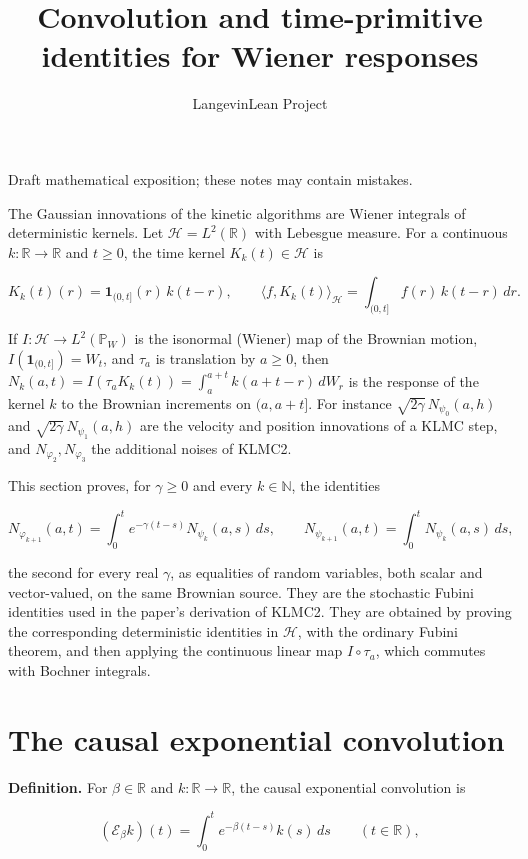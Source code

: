 \documentclass[11pt,a4paper]{article}
\title{\texorpdfstring{Convolution and time-primitive identities for Wiener responses}{Convolution and time-primitive identities for Wiener responses}}
\author{LangevinLean Project}
\date{}
\begin{document}
\maketitle
Draft mathematical exposition; these notes may contain mistakes.


The Gaussian innovations of the kinetic algorithms are Wiener integrals of deterministic kernels. Let \(\mathcal H=L^2(\mathbb R)\) with Lebesgue measure. For a continuous \(k:\mathbb R\to\mathbb R\) and \(t\ge0\), the time kernel \(K_k(t)\in\mathcal H\) is


\[K_k(t)(r)=\mathbf 1_{(0,t]}(r)\,k(t-r),\qquad\langle f,K_k(t)\rangle_{\mathcal H}=\int_{(0,t]}f(r)\,k(t-r)\,dr.\]


If \(I:\mathcal H\to L^2(\mathbb P_W)\) is the isonormal (Wiener) map of the Brownian motion, \(I(\mathbf 1_{(0,t]})=W_t\), and \(\tau_a\) is translation by \(a\ge0\), then \(N_k(a,t)=I(\tau_aK_k(t))=\int_a^{a+t}k(a+t-r)\,dW_r\) is the response of the kernel \(k\) to the Brownian increments on \((a,a+t]\). For instance \(\sqrt{2\gamma}\,N_{\psi_0}(a,h)\) and \(\sqrt{2\gamma}\,N_{\psi_1}(a,h)\) are the velocity and position innovations of a KLMC step, and \(N_{\varphi_2},N_{\varphi_3}\) the additional noises of KLMC2.




This section proves, for \(\gamma\ge0\) and every \(k\in\mathbb N\), the identities


\[N_{\varphi_{k+1}}(a,t)=\int_0^te^{-\gamma(t-s)}N_{\psi_k}(a,s)\,ds,\qquad N_{\psi_{k+1}}(a,t)=\int_0^tN_{\psi_k}(a,s)\,ds,\]


the second for every real \(\gamma\), as equalities of random variables, both scalar and vector-valued, on the same Brownian source. They are the stochastic Fubini identities used in the paper's derivation of KLMC2. They are obtained by proving the corresponding deterministic identities in \(\mathcal H\), with the ordinary Fubini theorem, and then applying the continuous linear map \(I\circ\tau_a\), which commutes with Bochner integrals.


\section{\texorpdfstring{The causal exponential convolution}{The causal exponential convolution}}


\textbf{Definition.} For \(\beta\in\mathbb R\) and \(k:\mathbb R\to\mathbb R\), the causal exponential convolution is


\[(\mathcal E_\beta k)(t)=\int_0^te^{-\beta(t-s)}k(s)\,ds\qquad(t\in\mathbb R),\]
\end{document}

